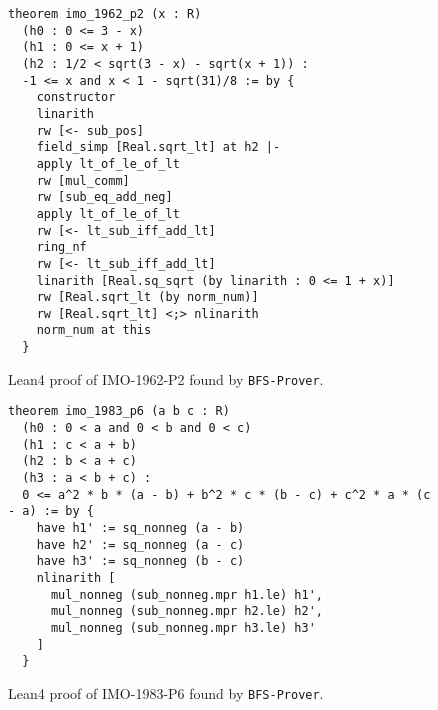 \documentclass[10pt,english]{article}
\begin{document}
\begin{figure*}[htbp]
\begin{minipage}{\textwidth}
\begin{Verbatim}[frame=single,framesep=3mm,framerule=0.5mm]
theorem imo_1962_p2 (x : R)
  (h0 : 0 <= 3 - x)
  (h1 : 0 <= x + 1)
  (h2 : 1/2 < sqrt(3 - x) - sqrt(x + 1)) :
  -1 <= x and x < 1 - sqrt(31)/8 := by {
    constructor
    linarith
    rw [<- sub_pos]
    field_simp [Real.sqrt_lt] at h2 |-
    apply lt_of_le_of_lt
    rw [mul_comm]
    rw [sub_eq_add_neg]
    apply lt_of_le_of_lt
    rw [<- lt_sub_iff_add_lt]
    ring_nf
    rw [<- lt_sub_iff_add_lt]
    linarith [Real.sq_sqrt (by linarith : 0 <= 1 + x)]
    rw [Real.sqrt_lt (by norm_num)]
    rw [Real.sqrt_lt] <;> nlinarith
    norm_num at this
  }
\end{Verbatim}
\caption{Lean4 proof of IMO-1962-P2 found by \texttt{BFS-Prover}.}
\label{fig:imo1962p2}
\end{minipage}
\end{figure*}

\begin{figure*}[htbp]
\begin{minipage}{\textwidth}
\begin{Verbatim}[frame=single,framesep=3mm,framerule=0.5mm]
theorem imo_1983_p6 (a b c : R)
  (h0 : 0 < a and 0 < b and 0 < c)
  (h1 : c < a + b)
  (h2 : b < a + c)
  (h3 : a < b + c) :
  0 <= a^2 * b * (a - b) + b^2 * c * (b - c) + c^2 * a * (c - a) := by {
    have h1' := sq_nonneg (a - b)
    have h2' := sq_nonneg (a - c)
    have h3' := sq_nonneg (b - c)
    nlinarith [
      mul_nonneg (sub_nonneg.mpr h1.le) h1',
      mul_nonneg (sub_nonneg.mpr h2.le) h2',
      mul_nonneg (sub_nonneg.mpr h3.le) h3'
    ]
  }
\end{Verbatim}
\caption{Lean4 proof of IMO-1983-P6 found by \texttt{BFS-Prover}.}
\label{fig:imo1983p6}
\end{minipage}
\end{figure*}
\end{document}

